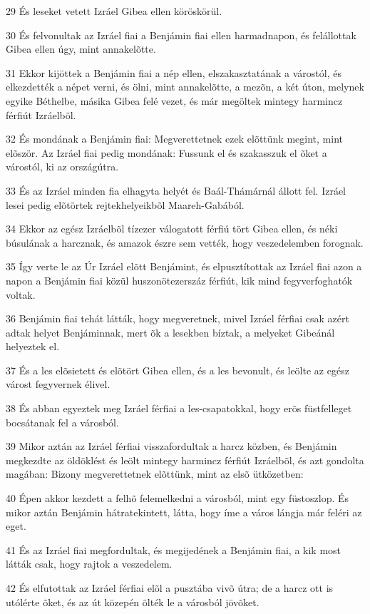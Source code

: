 \par 29 És leseket vetett Izráel Gibea ellen köröskörül.
\par 30 És felvonultak az Izráel fiai a Benjámin fiai ellen harmadnapon, és felállottak Gibea ellen úgy, mint annakelõtte.
\par 31 Ekkor kijöttek a Benjámin fiai a nép ellen, elszakasztatának a várostól, és elkezdették a népet verni, és ölni, mint annakelõtte, a mezõn, a két úton, melynek egyike Béthelbe, másika Gibea felé vezet, és már megöltek mintegy harmincz férfiút Izráelbõl.
\par 32 És mondának a Benjámin fiai: Megverettetnek ezek elõttünk megint, mint elõször. Az Izráel fiai pedig mondának: Fussunk el és szakasszuk el õket a várostól, ki az országútra.
\par 33 És az Izráel minden fia elhagyta helyét és Baál-Thámárnál állott fel. Izráel lesei pedig elõtörtek rejtekhelyeikbõl Maareh-Gabából.
\par 34 Ekkor az egész Izráelbõl tízezer válogatott férfiú tört Gibea ellen, és néki búsulának a harcznak, és amazok észre sem vették, hogy veszedelemben forognak.
\par 35 Így verte le az Úr Izráel elõtt Benjámint, és elpusztítottak az Izráel fiai azon a napon a Benjámin fiai közül huszonötezerszáz férfiút, kik mind fegyverfoghatók voltak.
\par 36 Benjámin fiai tehát látták, hogy megveretnek, mivel Izráel férfiai csak azért adtak helyet Benjáminnak, mert õk a lesekben bíztak, a melyeket Gibeánál helyeztek el.
\par 37 És a les elõsietett és elõtört Gibea ellen, és a les bevonult, és leölte az egész várost fegyvernek élivel.
\par 38 És abban egyeztek meg Izráel férfiai a les-csapatokkal, hogy erõs füstfelleget bocsátanak fel a városból.
\par 39 Mikor aztán az Izráel férfiai visszafordultak a harcz közben, és Benjámin megkezdte az öldöklést és leölt mintegy harmincz férfiút Izráelbõl, és azt gondolta magában: Bizony megverettetnek elõttünk, mint az elsõ ütközetben:
\par 40 Épen akkor kezdett a felhõ felemelkedni a városból, mint egy füstoszlop. És mikor aztán Benjámin hátratekintett, látta, hogy íme a város lángja már feléri az eget.
\par 41 És az Izráel fiai megfordultak, és megijedének a Benjámin fiai, a kik most látták csak, hogy rajtok a veszedelem.
\par 42 És elfutottak az Izráel férfiai elõl a pusztába vivõ útra; de a harcz ott is utólérte õket, és az út közepén ölték le a városból jövõket.
